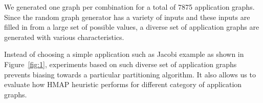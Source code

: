 {\setlength{\parindent}{0cm}
We generated one graph per combination for a total of 7875 application
graphs. Since the random graph generator has a variety of inputs and these
inputs are filled in from a large set of possible values, a diverse set of
application graphs are generated with various characteristics.}

Instead of choosing a simple application such as Jacobi example as shown in
Figure~\ref{fig:1}, experiments based on such diverse set of application graphs
prevents biasing towards a particular partitioning algorithm. It also allows us
to evaluate how HMAP heuristic performs for different category of application
graphs.




